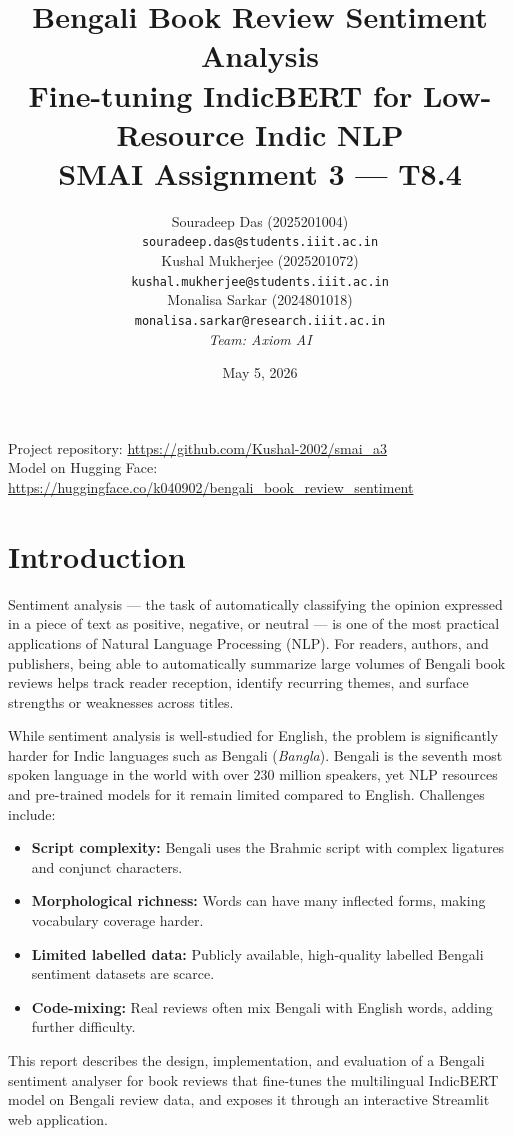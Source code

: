 \documentclass[11pt,a4paper]{article}
\title{
    \textbf{Bengali Book Review Sentiment Analysis} \\[0.5em]
    \large Fine-tuning IndicBERT for Low-Resource Indic NLP \\[0.3em]
    \normalsize SMAI Assignment 3 --- T8.4
}
\author{Souradeep Das (2025201004) \\
\texttt{souradeep.das@students.iiit.ac.in} \\
Kushal Mukherjee (2025201072) \\
\texttt{kushal.mukherjee@students.iiit.ac.in} \\
Monalisa Sarkar (2024801018) \\
\texttt{monalisa.sarkar@research.iiit.ac.in} \\
\textit{Team: Axiom AI}}
\date{May 5, 2026}
\begin{document}
\maketitle
\thispagestyle{fancy}

\noindent Project repository: \url{https://github.com/Kushal-2002/smai_a3} \\
Model on Hugging Face: \url{https://huggingface.co/k040902/bengali_book_review_sentiment}

\section{Introduction}

Sentiment analysis — the task of automatically classifying the opinion expressed in a piece of text as positive, negative, or neutral — is one of the most practical applications of Natural Language Processing (NLP). For readers, authors, and publishers, being able to automatically summarize large volumes of Bengali book reviews helps track reader reception, identify recurring themes, and surface strengths or weaknesses across titles.

While sentiment analysis is well-studied for English, the problem is significantly harder for Indic languages such as Bengali (\textit{Bangla}). Bengali is the seventh most spoken language in the world with over 230 million speakers, yet NLP resources and pre-trained models for it remain limited compared to English. Challenges include:
\begin{itemize}[noitemsep]
    \item \textbf{Script complexity:} Bengali uses the Brahmic script with complex ligatures and conjunct characters.
    \item \textbf{Morphological richness:} Words can have many inflected forms, making vocabulary coverage harder.
    \item \textbf{Limited labelled data:} Publicly available, high-quality labelled Bengali sentiment datasets are scarce.
    \item \textbf{Code-mixing:} Real reviews often mix Bengali with English words, adding further difficulty.
\end{itemize}

This report describes the design, implementation, and evaluation of a Bengali sentiment analyser for book reviews that fine-tunes the multilingual IndicBERT model on Bengali review data, and exposes it through an interactive Streamlit web application.
\end{document}

